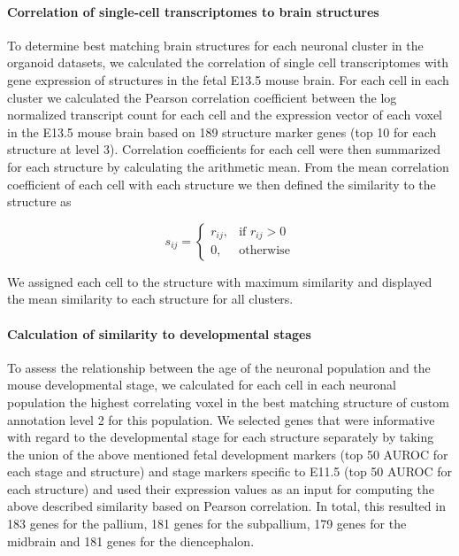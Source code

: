 \paragraph{Correlation of single-cell transcriptomes to brain structures}
To determine best matching brain structures for each neuronal cluster in the organoid datasets, we calculated the correlation of single cell transcriptomes with gene expression of structures in the fetal E13.5 mouse brain. For each cell in each cluster we calculated the Pearson correlation coefficient between the log normalized transcript count for each cell and the expression vector of each voxel in the E13.5 mouse brain based on 189 structure marker genes (top 10 for each structure at level 3). Correlation coefficients for each cell were then summarized for each structure by calculating the arithmetic mean. From the mean correlation coefficient of each cell with each structure we then defined the similarity to the structure as 


\[
s_{ij} = 
\begin{cases}
    r_{ij}, & \text{if } r_{ij} > 0\\
    0,              & \text{otherwise}
\end{cases}
\]

We assigned each cell to the structure with maximum similarity and displayed the mean similarity to each structure for all clusters. 
  
\paragraph{Calculation of similarity to developmental stages}
To assess the relationship between the age of the neuronal population and the mouse developmental stage, we calculated for each cell in each neuronal population the highest correlating voxel in the best matching structure of custom annotation level 2 for this population. We selected genes that were informative with regard to the developmental stage for each structure separately by taking the union of the above mentioned fetal development markers (top 50 AUROC for each stage and structure) and stage markers specific to E11.5 (top 50 AUROC for each structure) and used their expression values as an input for computing the above described similarity based on Pearson correlation. In total, this resulted in 183 genes for the pallium, 181 genes for the subpallium, 179 genes for the midbrain and 181 genes for the diencephalon. 

